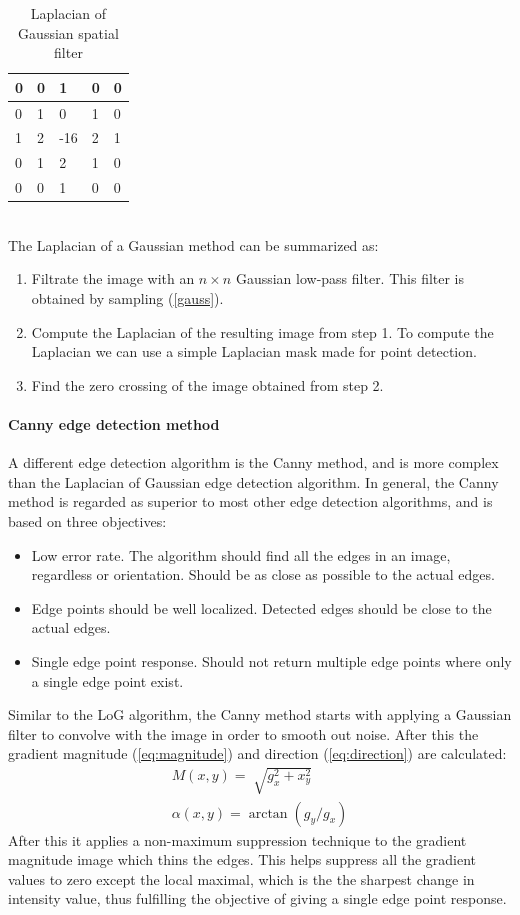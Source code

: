\begin{table}[h]
\centering
\caption{Laplacian of Gaussian spatial filter}
\begin{tabular}{|l|l|l|l|l|}
\hline
0 & 0 & 1   & 0 & 0\\\hline
0 & 1 & 0   & 1 & 0\\\hline
1 & 2 & -16 & 2 & 1\\\hline
0 & 1 & 2   & 1 & 0\\\hline
0 & 0 & 1   & 0 & 0\\\hline
\end{tabular}
\label{LoG}
\end{table}\\

The Laplacian of a Gaussian method can be summarized as:
\begin{enumerate}
\item Filtrate the image with an $n\times n$ Gaussian low-pass filter. This filter is obtained by sampling (\ref{gauss}).
\item Compute the Laplacian of the resulting image from step 1. To compute the Laplacian we can use a simple Laplacian mask made for point detection.
\item Find the zero crossing of the image obtained from step 2.
\end{enumerate}

\paragraph{Canny edge detection method}
A different edge detection algorithm is the Canny method, and is more complex than the Laplacian of Gaussian edge detection algorithm. In general, the Canny method is regarded as superior to most other edge detection algorithms, and is based on three objectives:
\begin{itemize}
\item Low error rate. The algorithm should find all the edges in an image, regardless or orientation. Should be as close as possible to the actual edges.
\item Edge points should be well localized. Detected edges should be close to the actual edges.
\item Single edge point response. Should not return multiple edge points where only a single edge point exist.
\end{itemize}
Similar to the LoG algorithm, the Canny method starts with applying a Gaussian filter to convolve with the image in order to smooth out noise. After this the gradient magnitude (\ref{eq:magnitude}) and direction (\ref{eq:direction}) are calculated:
\begin{align*}
M(x,y) = \sqrt[]{g_x^2 +x_y^2}\\
\alpha(x,y) = \arctan(g_y/g_x)
\end{align*}
After this it applies a non-maximum suppression technique to the gradient magnitude image which thins the edges. This helps suppress all the gradient values to zero except the local maximal, which is the the sharpest change in intensity value, thus fulfilling the objective of giving a single edge point response.\\

